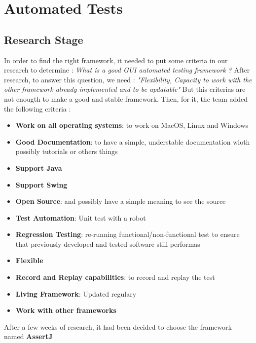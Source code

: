 \documentclass[12pt]{article}
\begin{document}
\newpage

\section{Automated Tests}
\subsection{Research Stage}
In order to find the right framework, it needed to put some criteria in our research to determine : \textit{What is a good GUI automated testing framework ?}
After research, to answer this question, we need : \textit{"Flexibility, Capacity to work with the other framework already implemented and to be updatable"}
But this criterias are not enougth to make a good and stable framework. \newline
Then, for it, the team added the following criteria :

\begin{itemize}
  \item \textbf{Work on all operating systems}: to work on MacOS, Linux and Windows
  \item \textbf{Good Documentation}: to have a simple, understable documentation wioth possibly tutorials or others things
  \item \textbf{Support Java}
  \item \textbf{Support Swing}
  \item \textbf{Open Source}: and possibly have a simple meaning to see the source
  \item \textbf{Test Automation}: Unit test with a robot
  \item \textbf{Regression Testing}: re-running functional/non-functional test to ensure that previously developed and tested software still performas
  \item \textbf{Flexible}
  \item \textbf{Record and Replay capabilities}: to record and replay the test
  \item \textbf{Living Framework}: Updated regulary
  \item \textbf{Work with other frameworks}
\end{itemize}

After a few weeks of research, it had been decided to choose the framework named \textbf{AssertJ}
\end{document}
